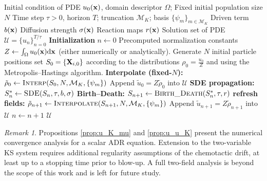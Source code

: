 \documentclass[a4paper,fleqn]{cas-sc}
\theoremstyle{definition}
\theoremstyle{remark}
\newtheorem{remark}[theorem]{Remark}
\begin{document}
\begin{algorithm}
    \caption{Stochastic Branching for linear scalar reaction--diffusion--advection equation} \label{alg:linear}
    \begin{algorithmic}
        \Require Initial condition of PDE $u_0(\mathbf{x})$, domain descriptor $\Omega$;
        \Require Fixed initial population size $N$
        \Require Time step $\tau>0$, horizon $T$; truncation $\mathcal M_K$; basis $\{\psi_m\}_{m\in\mathcal M_K}$
        \Require Driven term $b(\mathbf{x})$
        \Require Diffusion strength $\sigma(\mathbf{x})$
        \Require Reaction maps $r(\mathbf{x})$
        \Ensure  Solution set of PDE $\mathcal U = \{u_n\}_{n=0}^{T/\tau}$
        \State \textbf{Initialization}
        \State $n\gets 0$
        \State Precomputed normalization constants  $Z\gets \int_\Omega u_0(\mathbf{x})\mathrm{d} \mathbf{x}$  (either numerically or analytically).
        \State Generate $N$ initial particle positions set $S_0=\{\mathbf{X}_{i,0}\}$ according to the distributions $\rho_0=\frac{u_0}{Z}$ and using the Metropolis--Hastings algorithm.
        \State \textbf{Interpolate (fixed-$N$):}
        \State $\tilde\rho_0 \gets \textsc{Interp}(S_0,N,\mathcal M_K,\{\psi_m\})$
        \State Append $\tilde u_0 = Z\tilde \rho_0$ into $\mathcal U$
            \State \textbf{SDE propagation:}
            \State $S_n^*\gets \textsc{SDE}(S_n,\tau,b,\sigma)$
            \State \textbf{Birth--Death:}
            \State $S_{n+1}\gets \textsc{Birth\_Death}(S_{n}^*,\tau,r)$
            \State \textbf{refresh fields:}
            \State $\tilde\rho_{n+1} \gets \textsc{Interpolate}(S_{n+1},N,\mathcal M_K,\{\psi_m\})$
            \State Append $\tilde u_{n+1} = Z\tilde \rho_{n+1}$ into $\mathcal U$
            \State $n\gets n+1$
        \EndWhile
        \State \Return $\mathcal U$
        \EndProcedure
    \end{algorithmic}
\end{algorithm}

\begin{remark}
Propositions \ref{prop:u_K_mu} and \ref{prop:u_u_K} present the numerical convergence analysis for a scalar ADR equation. Extension to the two-variable KS system requires additional regularity assumptions of  the chemotactic drift, at least up to a stopping time prior to blow-up. A full two-field analysis is beyond the scope of this work and is left for future study.    
\end{remark}
\end{document}
